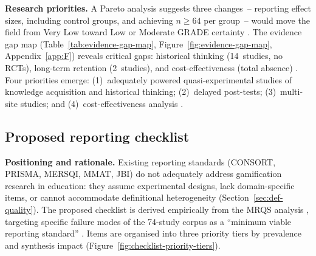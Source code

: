 \textbf{Research priorities.} \label{sec:research-priorities} A Pareto analysis suggests three changes~-- reporting effect sizes, including control groups, and achieving $n \geq 64$ per group~-- would move the field from Very Low toward Low or Moderate GRADE certainty \cite{GuyattGRADE2008, Kraft2020}. The evidence gap map (Table~\ref{tab:evidence-gap-map}, Figure~\ref{fig:evidence-gap-map}, Appendix~\ref{app:F}) reveals critical gaps: historical thinking (14~studies, no RCTs), long-term retention (2~studies), and cost-effectiveness (total absence) \cite{Korniienko2025mrqs, Campbell2020}. Four priorities emerge: (1)~adequately powered quasi-experimental studies of knowledge acquisition and historical thinking; (2)~delayed post-tests; (3)~multi-site studies; and (4)~cost-effectiveness analysis \cite{KorniienkoSemerikov2024, Borenstein2009, Schulz2010CONSORT}.

\subsection{Proposed reporting checklist} \label{sec:reporting-checklist}

\textbf{Positioning and rationale.} \label{sec:checklist-positioning} Existing reporting standards (CONSORT, PRISMA, MERSQI, MMAT, JBI) do not adequately address gamification research in education: they assume experimental designs, lack domain-specific items, or cannot accommodate definitional heterogeneity (Section~\ref{sec:def-quality}). The proposed checklist is derived empirically from the MRQS analysis \cite{Korniienko2025mrqs}, targeting specific failure modes of the 74-study corpus as a ``minimum viable reporting standard'' \cite{CookReed2015}. Items are organised into three priority tiers by prevalence and synthesis impact (Figure~\ref{fig:checklist-priority-tiers}).



